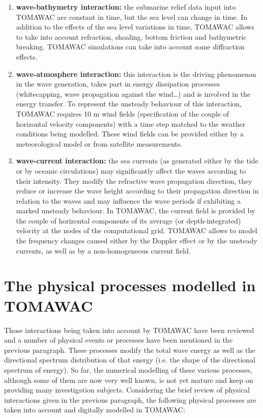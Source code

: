  \begin{enumerate}
\item \textbf{wave-bathymetry interaction:} the submarine relief data input into TOMAWAC are constant in time, but the sea level can change in time. In addition to the effects of the sea level variations in time, TOMAWAC allows to take into account refraction, shoaling, bottom friction and bathymetric breaking. TOMAWAC simulations can take into account some diffraction effects.

 \item \textbf{wave-atmosphere interaction:} this interaction is the driving phenomenon in the wave generation, takes part in energy dissipation processes (whitecapping, wave propagation against the wind\dots ) and is involved in the energy transfer. To represent the unsteady behaviour of this interaction, TOMAWAC requires 10 m wind fields (specification of the couple of horizontal velocity components) with a time step matched to the weather conditions being modelled. These wind fields can be provided either by a meteorological model or from satellite measurements.

 \item \textbf{wave-current interaction:} the sea currents (as generated either by the tide or by oceanic circulations) may significantly affect the waves according to their intensity. They modify the refractive wave propagation direction, they reduce or increase the wave height according to their propagation direction in relation to the waves and may influence the wave periods if exhibiting a marked unsteady behaviour. In TOMAWAC, the current field is provided by the couple of horizontal components of its average (or depth-integrated) velocity at the nodes of the computational grid. TOMAWAC allows to model the frequency changes caused either by the Doppler effect or by the unsteady currents, as well as by a non-homogeneous current field.
\end{enumerate}


\section{ The physical processes modelled in TOMAWAC}

 Those interactions being taken into account by TOMAWAC have been reviewed and a number of physical events or processes have been mentioned in the previous paragraph. These processes modify the total wave energy as well as the directional spectrum distribution of that energy (i.e. the shape of the directional spectrum of energy). So far, the numerical modelling of these various processes, although some of them are now very well known, is not yet mature and keep on providing many investigation subjects. Considering the brief review of physical interactions given in the previous paragraph, the following physical processes are taken into account and digitally modelled in TOMAWAC:

